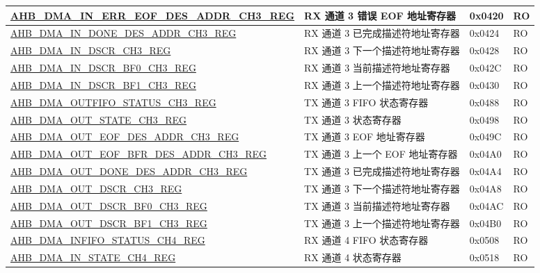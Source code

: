 \begin{longtable}{ | l | l | p{1.3cm} | l | }
\hyperref[regdesc:AHBDMAINERREOFDESADDRCHNREG]{AHB\_DMA\_IN\_ERR\_EOF\_DES\_ADDR\_CH3\_REG} & RX 通道 3 错误 EOF 地址寄存器 & 0x0420 & RO    \\ \hline
\hyperref[regdesc:AHBDMAINDONEDESADDRCHNREG]{AHB\_DMA\_IN\_DONE\_DES\_ADDR\_CH3\_REG} & RX 通道 3 已完成描述符地址寄存器 & 0x0424 & RO    \\ \hline
\hyperref[regdesc:AHBDMAINDSCRCHNREG]{AHB\_DMA\_IN\_DSCR\_CH3\_REG} & RX 通道 3 下一个描述符地址寄存器 & 0x0428 & RO    \\ \hline
\hyperref[regdesc:AHBDMAINDSCRBF0CHNREG]{AHB\_DMA\_IN\_DSCR\_BF0\_CH3\_REG} & RX 通道 3 当前描述符地址寄存器 & 0x042C & RO    \\ \hline
\hyperref[regdesc:AHBDMAINDSCRBF1CHNREG]{AHB\_DMA\_IN\_DSCR\_BF1\_CH3\_REG} & RX 通道 3 上一个描述符地址寄存器 & 0x0430 & RO    \\ \hline
\hyperref[regdesc:AHBDMAOUTFIFOSTATUSCHNREG]{AHB\_DMA\_OUTFIFO\_STATUS\_CH3\_REG} & TX 通道 3 FIFO 状态寄存器 & 0x0488 & RO    \\ \hline
\hyperref[regdesc:AHBDMAOUTSTATECHNREG]{AHB\_DMA\_OUT\_STATE\_CH3\_REG} & TX 通道 3 状态寄存器 & 0x0498 & RO    \\ \hline
\hyperref[regdesc:AHBDMAOUTEOFDESADDRCHNREG]{AHB\_DMA\_OUT\_EOF\_DES\_ADDR\_CH3\_REG} & TX 通道 3 EOF 地址寄存器 & 0x049C & RO    \\ \hline
\hyperref[regdesc:AHBDMAOUTEOFBFRDESADDRCHNREG]{AHB\_DMA\_OUT\_EOF\_BFR\_DES\_ADDR\_CH3\_REG} & TX 通道 3 上一个 EOF 地址寄存器 & 0x04A0 & RO    \\ \hline
\hyperref[regdesc:AHBDMAOUTDONEDESADDRCHNREG]{AHB\_DMA\_OUT\_DONE\_DES\_ADDR\_CH3\_REG} & TX 通道 3 已完成描述符地址寄存器 & 0x04A4 & RO    \\ \hline
\hyperref[regdesc:AHBDMAOUTDSCRCHNREG]{AHB\_DMA\_OUT\_DSCR\_CH3\_REG} & TX 通道 3 下一个描述符地址寄存器 & 0x04A8 & RO    \\ \hline
\hyperref[regdesc:AHBDMAOUTDSCRBF0CHNREG]{AHB\_DMA\_OUT\_DSCR\_BF0\_CH3\_REG} & TX 通道 3 当前描述符地址寄存器 & 0x04AC & RO    \\ \hline
\hyperref[regdesc:AHBDMAOUTDSCRBF1CHNREG]{AHB\_DMA\_OUT\_DSCR\_BF1\_CH3\_REG} & TX 通道 3 上一个描述符地址寄存器 & 0x04B0 & RO    \\ \hline
\hyperref[regdesc:AHBDMAINFIFOSTATUSCHNREG]{AHB\_DMA\_INFIFO\_STATUS\_CH4\_REG} & RX 通道 4 FIFO 状态寄存器 & 0x0508 & RO    \\ \hline
\hyperref[regdesc:AHBDMAINSTATECHNREG]{AHB\_DMA\_IN\_STATE\_CH4\_REG} & RX 通道 4 状态寄存器 & 0x0518 & RO    \\ \hline

\end{longtable}
